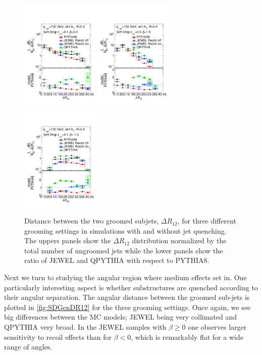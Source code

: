 \begin{figure}[th!]
\centering
\includegraphics[width=0.33\textwidth]{figures/SDGen/DR12CompModelsBeta00Z01.pdf}%
\includegraphics[width=0.33\textwidth]{figures/SDGen/DR12CompModelsBeta15Z05.pdf}%
\includegraphics[width=0.33\textwidth]{figures/SDGen/DR12CompModelsBetam1Z01.pdf}%
\caption{Distance between the two groomed subjets, $\Delta R_{12}$, for three different grooming settings in simulations with and without jet quenching. The uppers panels show the $\Delta R_{\mathrm{12}}$ distribution normalized by the total number of ungroomed jets while the lower panels show the ratio of JEWEL and QPYTHIA with respect to PYTHIA8.}
\label{fig:SDGenDR12}
\end{figure}
Next we  turn to studying the angular region where medium effects set in. One particularly interesting aspect is whether substructures are quenched according to their angular separation. The angular distance between the groomed sub-jets is plotted in \autoref{fig:SDGenDR12} for the three grooming settings. Once again, we see big differences between the MC models; JEWEL being very collimated and QPYTHIA very broad. In the JEWEL samples with $\beta \geq 0$ one observes larger sensitivity to recoil effects than for $\beta < 0$, which is remarkably flat for a wide range of angles.

